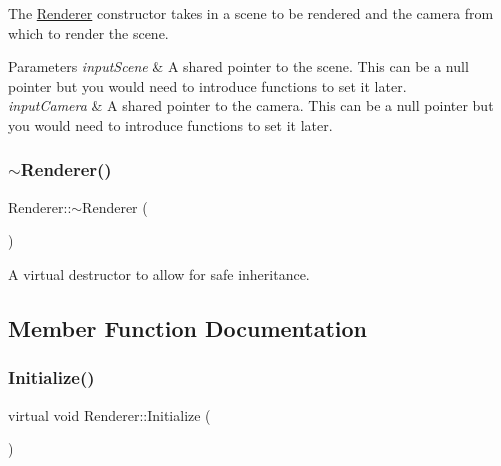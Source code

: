 The \hyperlink{class_renderer}{Renderer} constructor takes in a scene to be rendered and the camera from which to render the scene.


\begin{DoxyParams}{Parameters}
{\em input\+Scene} & A shared pointer to the scene. This can be a null pointer but you would need to introduce functions to set it later. \\
\hline
{\em input\+Camera} & A shared pointer to the camera. This can be a null pointer but you would need to introduce functions to set it later. \\
\hline
\end{DoxyParams}
\hypertarget{class_renderer_afeee408862d5bd6255a6882d47e6d5cd}{}\label{class_renderer_afeee408862d5bd6255a6882d47e6d5cd}
\subsubsection{\texorpdfstring{$\sim$\+Renderer()}{~Renderer()}}
{\footnotesize\ttfamily Renderer\+::$\sim$\+Renderer (\begin{DoxyParamCaption}{ }\end{DoxyParamCaption})\hspace{0.3cm}{\ttfamily [virtual]}}



A virtual destructor to allow for safe inheritance.



\subsection{Member Function Documentation}
\hypertarget{class_renderer_a7cb221f355f181d84d66e8c09f50f04a}{}\label{class_renderer_a7cb221f355f181d84d66e8c09f50f04a}
\subsubsection{\texorpdfstring{Initialize()}{Initialize()}}
{\footnotesize\ttfamily virtual void Renderer\+::\+Initialize (\begin{DoxyParamCaption}{ }\end{DoxyParamCaption})\hspace{0.3cm}{\ttfamily [pure virtual]}}



